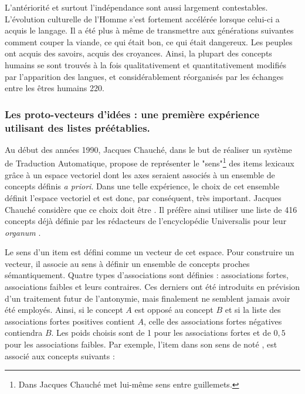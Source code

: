 {L'antériorité et surtout l'indépendance sont aussi largement
contestables.  L'évolution culturelle de l'Homme s'est fortement
accélérée lorsque celui-ci a acquis le langage. Il a été plus à même
de transmettre aux générations suivantes comment couper la viande, ce
qui était bon, ce qui était dangereux. Les peuples ont acquis des
savoirs, acquis des croyances.  Ainsi, la plupart des concepts humains
se sont trouvés à la fois qualitativement et quantitativement modifiés
par l'apparition des langues, et considérablement réorganisés par les
échanges entre les êtres humains \citep{Nyckees1998}{220}.

\subsubsection{Les proto-vecteurs d'idées : une première expérience utilisant des listes préétablies.} \label{sec:chauche}

Au début des années 1990, Jacques Chauché, dans le but de réaliser un
système de Traduction Automatique, propose de représenter le
"sens"\footnote{Dans \cite{Chauche1990} Jacques Chauché met lui-même
  sens entre guillemets.} des items lexicaux grâce à un espace
vectoriel dont les axes seraient associés à un ensemble de concepts
définis \emph{a priori}.  Dans une telle expérience, le choix de cet
ensemble définit l'espace vectoriel et est donc, par conséquent, très
important. Jacques Chauché considère que ce choix doit être
. Il préfère ainsi utiliser une liste de
416 concepts déjà définie par les rédacteurs de l'encyclopédie
Universalis pour leur \emph{organum} \cite{encyUnivers1968}.  %

Le sens d'un item est défini comme un vecteur de cet espace. Pour
construire un vecteur, il associe au sens à définir un ensemble de
concepts proches sémantiquement. Quatre types d'associations sont
définies : associations fortes, associations faibles et leurs
contraires. Ces derniers ont été introduits en prévision d'un
traitement futur de l'antonymie, mais finalement ne semblent jamais
avoir été employés. Ainsi, si le concept $A$ est opposé au concept $B$
et si la liste des associations fortes positives contient $A$, celle
des associations fortes négatives contiendra $B$. Les poids choisis
sont de 1 pour les associations fortes et de $0,5$ pour les
associations faibles.  Par exemple, l'item  dans son
sens de  noté ,
est associé aux concepts suivants :

}
